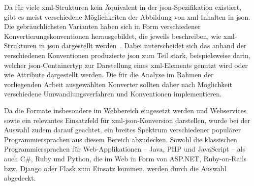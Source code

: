 Da für viele \acrshort{xml}-Strukturen kein Äquivalent in der \acrshort{json}-Spezifikation existiert, gibt es meist verschiedene Möglichkeiten der Abbildung von \acrshort{xml}-Inhalten in \acrshort{json}.
Die gebräuchlichsten Varianten haben sich in Form verschiedener Konvertierungskonventionen herausgebildet, die jeweils beschreiben, wie \acrshort{xml}-Strukturen in \acrshort{json} dargestellt werden~\cite{open311-conventions}. Dabei unterscheidet sich das anhand der verschiedenen Konventionen produzierte \acrshort{json} zum Teil stark, beispielsweise darin, welcher \acrshort{json}-Container\-typ zur Darstellung eines \acrshort{xml}-Elements genutzt wird oder wie Attribute dargestellt werden. Die für die Analyse im Rahmen der vorliegenden Arbeit ausgewählten Konverter sollten daher nach Möglichkeit verschiedene Umwandlungsverfahren und Konventionen implementieren.

Da die Formate insbesondere im Webbereich eingesetzt werden und Webservices sowie  ein relevantes Einsatzfeld für \acrshort{xml}-\acrshort{json}-Konversion darstellen, wurde bei der Auswahl zudem darauf geachtet, ein breites Spektrum verschiedener populärer Programmiersprachen aus diesem Bereich abzudecken. Sowohl die klassischen Programmiersprachen für Web-Applikationen --  Java, PHP und JavaScript -- als auch C\#, Ruby und Python, die im Web in Form von ASP.NET, Ruby-on-Rails bzw. Django oder Flask zum Einsatz kommen, werden durch die Auswahl abgedeckt.

